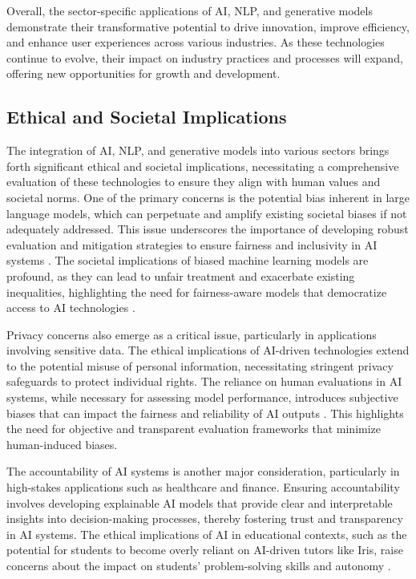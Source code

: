 Overall, the sector-specific applications of AI, NLP, and generative models demonstrate their transformative potential to drive innovation, improve efficiency, and enhance user experiences across various industries. As these technologies continue to evolve, their impact on industry practices and processes will expand, offering new opportunities for growth and development.



\subsection{Ethical and Societal Implications} \label{subsec:Ethical and Societal Implications}



The integration of AI, NLP, and generative models into various sectors brings forth significant ethical and societal implications, necessitating a comprehensive evaluation of these technologies to ensure they align with human values and societal norms. One of the primary concerns is the potential bias inherent in large language models, which can perpetuate and amplify existing societal biases if not adequately addressed. This issue underscores the importance of developing robust evaluation and mitigation strategies to ensure fairness and inclusivity in AI systems \cite{chowdhery2023palm}. The societal implications of biased machine learning models are profound, as they can lead to unfair treatment and exacerbate existing inequalities, highlighting the need for fairness-aware models that democratize access to AI technologies \cite{narayanan2023democratizecareneedfairness}.



Privacy concerns also emerge as a critical issue, particularly in applications involving sensitive data. The ethical implications of AI-driven technologies extend to the potential misuse of personal information, necessitating stringent privacy safeguards to protect individual rights. The reliance on human evaluations in AI systems, while necessary for assessing model performance, introduces subjective biases that can impact the fairness and reliability of AI outputs \cite{ghosh2024comparedespairreliablepreference}. This highlights the need for objective and transparent evaluation frameworks that minimize human-induced biases.



The accountability of AI systems is another major consideration, particularly in high-stakes applications such as healthcare and finance. Ensuring accountability involves developing explainable AI models that provide clear and interpretable insights into decision-making processes, thereby fostering trust and transparency in AI systems. The ethical implications of AI in educational contexts, such as the potential for students to become overly reliant on AI-driven tutors like Iris, raise concerns about the impact on students' problem-solving skills and autonomy \cite{bassner2024irisaidrivenvirtualtutor}.



